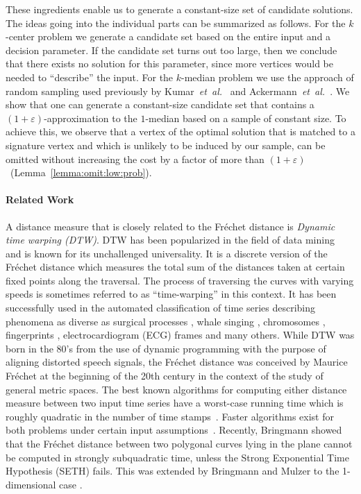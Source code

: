 \documentclass[11pt, letter]{article}
\newcommand{\etal}{\textit{e{}t~a{}l.}\xspace}
\newcommand{\lemref}[1]{Lemma~\ref{lemma:#1}}
\newcommand{\Frechet}{Fr\'echet\xspace}
\providecommand{\eps}{{\varepsilon}}\newcommand{\Astop}{\overline{a}}
\begin{document}
These ingredients enable us to generate a constant-size set of candidate solutions.
The ideas going into the individual parts can be summarized as follows.
For the $k$-center problem we generate a candidate set based on the 
entire input and a decision parameter. If the candidate set turns out too large,
then we conclude that there exists no solution for this parameter, since more
vertices would be needed to ``describe'' the input. 
For the $k$-median problem we use the approach of random sampling used
previously by Kumar~\etal~\cite{kumar2010lineartime} and Ackermann~\etal~\cite{abs-cm-10}.
We show that one can generate a constant-size candidate set that contains a
$(1+\eps)$-approximation to the $1$-median based on a sample of constant size.
To achieve this, we observe that a vertex of the optimal solution that is
matched to a signature vertex and which is unlikely to be induced by our
sample, can be omitted without increasing the cost by a factor of more than
$(1+\eps)$~(\lemref{omit:low:prob}).



\paragraph{Related Work}
A distance measure that is closely related to the \Frechet{} distance is \emph{Dynamic time warping (DTW)}.
DTW has been popularized in the field of data mining~\cite{dtswk-08,mueller07dtw} and is known for its unchallenged
universality.
It is a discrete version of the \Frechet
distance which measures the total sum of the distances taken at certain fixed
points along the traversal. The process of traversing the curves with varying
speeds is sometimes referred to as ``time-warping'' in this context.
It has been successfully used in the automated classification of time series
describing phenomena as diverse as surgical processes \cite{Forestier2012255},
whale singing \cite{bmp-ackw-07}, chromosomes \cite{Legrand2008215},
fingerprints \cite{888711}, electrocardiogram (ECG) frames \cite{1013101} and
many others.  
While DTW was born in the 80's from the use of dynamic programming with the
purpose of aligning distorted speech signals, the \Frechet{} distance was
conceived by Maurice \Frechet{} at the beginning of the 20th century in the
context of the study of general metric spaces. 
The best known algorithms for computing either distance measure between two
input time series have a worst-case running time which is roughly quadratic in
the number of time stamps~\cite{buchin2012four, mueller07dtw}. Faster
algorithms exist for both problems under certain input
assumptions~\cite{dhw-afd-12,keogh2005exact}. Recently, Bringmann
showed~\cite{Bringmann14} that the \Frechet{} distance between two polygonal
curves lying in the plane cannot be computed in strongly subquadratic time, unless
the Strong Exponential Time Hypothesis (SETH) fails. This was extended by Bringmann and Mulzer to the 1-dimensional case \cite{bm-adfd-15}.
\end{document}
